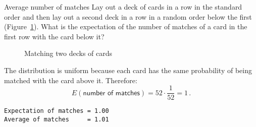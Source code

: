 
\begin{prob}{Average number of matches}
Lay out a deck of cards in a row in the standard order and then lay out a second deck in a row in a random order below the first (Figure~\ref{f.cards}). What is the expectation of the number of matches of a card in the first row with the card below it?
\end{prob}

\begin{figure}[tb]
\begin{center}
\end{center}
\caption{Matching two decks of cards}\label{f.cards}
\end{figure}

\solution{}

The distribution is uniform because each card has the same probability of being matched with the card above it. Therefore:
\[
E(\textsf{number of matches}) = 52\cdot \frac{1}{52} = 1\,.
\]

\begin{verbatim}
Expectation of matches = 1.00
Average of matches     = 1.01
\end{verbatim}

